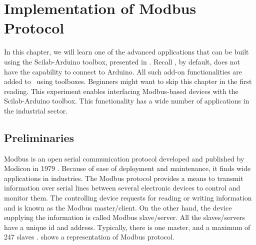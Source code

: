 \chapter {Implementation of Modbus Protocol}
\thispagestyle{empty}
\label{modbus}

\newcommand{\LocMODfig}{\Origin/user-code/modbus/figures}
\newcommand{\LocMODscicode}{\Origin/user-code/modbus/scilab}
\newcommand{\LocMODscibrief}[1]{{\tt \seqsplit{%
        Origin/user-code/modbus/scilab}}, see \fnrefp{fn:file-loc}}
\newcommand{\LocMODardcode}{\Origin/user-code/modbus/arduino}
\newcommand{\LocMODardbrief}[1]{{\tt \seqsplit{%
        Origin/user-code/modbus/arduino}}, see \fnrefp{fn:file-loc}}

\newcommand{\LocMODpycode}{\Origin/user-code/modbus/python}
\newcommand{\LocMODpybrief}[1]{{\tt \seqsplit{%
        Origin/user-code/modbus/python}}, see \fnrefp{fn:file-loc}}


\newcommand{\LocMODjuliacode}{\Origin/user-code/modbus/julia}
\newcommand{\LocMODjuliabrief}[1]{{\tt \seqsplit{%
        Origin/user-code/modbus/julia}}, see \fnrefp{fn:file-loc}}




\newcommand{\LocMODOpenModelicacode}{\Origin/user-code/modbus/OpenModelica}
\newcommand{\LocMODOpenModelicabrief}[1]{{\tt \seqsplit{%
        Origin/user-code/modbus/OpenModelica}}, see \fnrefp{fn:file-loc}}


In this chapter, we will learn one of the advanced applications that
can be built using the Scilab-Arduino toolbox, presented in 
. Recall \scilab, by default, 
does not have the capability to connect to
Arduino. All such add-on functionalities are added to \scilab\ using
toolboxes. Beginners might want to
skip this chapter in the first reading. This experiment enables
interfacing Modbus-based devices with the Scilab-Arduino toolbox. This
functionality has a wide number of applications in the industrial
sector.


\section{Preliminaries}
Modbus is an open serial communication protocol developed and
published by Modicon in 1979 \cite{modbus}. Because of ease of deployment and
maintenance, it finds wide applications in industries. The Modbus
protocol provides a means to transmit information over serial lines
between several electronic devices to control and monitor
them. The controlling device requests for reading or writing
information and is known as the Modbus master/client. On the other
hand, the device supplying the information is called
Modbus slave/server. All the slaves/servers have a unique id and
address. Typically, there is one master, and a maximum of 247 slaves \cite{simplymodbus}.
 shows a representation of Modbus protocol. 

